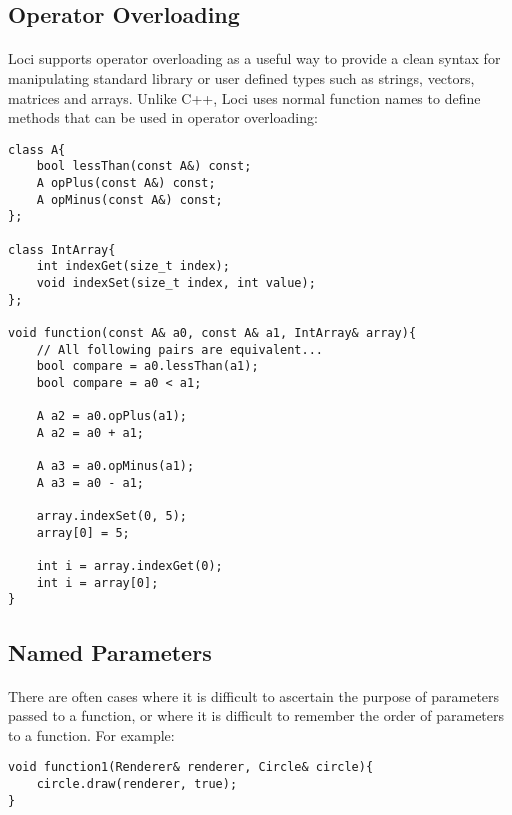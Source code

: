 \documentclass[12pt,twoside,notitlepage]{report}
\begin{document}
\clearpage

\subsection{Operator Overloading}

\paragraph{}
Loci supports operator overloading as a useful way to provide a clean syntax for manipulating standard library or user defined types such as strings, vectors, matrices and arrays. Unlike C++, Loci uses normal function names to define methods that can be used in operator overloading:


\begin{lstlisting}
class A{
	bool lessThan(const A&) const;
	A opPlus(const A&) const;
	A opMinus(const A&) const;
};

class IntArray{
	int indexGet(size_t index);
	void indexSet(size_t index, int value);
};

void function(const A& a0, const A& a1, IntArray& array){
	// All following pairs are equivalent...
	bool compare = a0.lessThan(a1);
	bool compare = a0 < a1;
	
	A a2 = a0.opPlus(a1);
	A a2 = a0 + a1;
	
	A a3 = a0.opMinus(a1);
	A a3 = a0 - a1;
	
	array.indexSet(0, 5);
	array[0] = 5;
	
	int i = array.indexGet(0);
	int i = array[0];
}
\end{lstlisting}


\clearpage

\subsection{Named Parameters}

\paragraph{}
There are often cases where it is difficult to ascertain the purpose of parameters passed to a function, or where it is difficult to remember the order of parameters to a function. For example:


\begin{lstlisting}
void function1(Renderer& renderer, Circle& circle){
	circle.draw(renderer, true);
}
\end{lstlisting}
\end{document}
